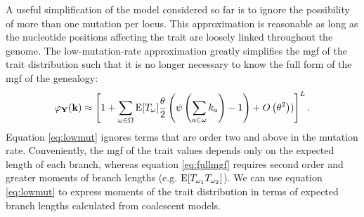 A useful simplification of the model considered so far is to ignore the
possibility of more than one mutation per locus. This approximation is
reasonable as long as the nucleotide positions affecting the trait are loosely
linked throughout the genome. The low-mutation-rate approximation greatly
simplifies the mgf of the trait distribution such that it is no longer necessary
to know the full form of the mgf of the genealogy:
\begin{equation}
\label{eq:lowmut}
\varphi_{\mathbf{Y}}(\mathbf{k}) \approx \left[ 1 + \sum_{\omega \in \Omega}
  \mathrm{E}[T_\omega] \frac{\theta}{2} \left( \psi\left( \sum_{a \in \omega} k_a\right) -1 \right) +
  O\left( \theta^2 \right))\right]^L.
\end{equation}
Equation \eqref{eq:lowmut} ignores terms that are order two and above in the
mutation rate. Conveniently, the mgf of the trait values depends only on the
expected length of each branch, whereas equation \eqref{eq:fullmgf} requires
second order and greater moments of branch lengths (e.g.
$\mathrm{E}[T_{\omega_1}T_{\omega_2}]$). We can use equation \eqref{eq:lowmut} to
express moments of the trait distribution in terms of expected branch lengths
calculated from coalescent models.

